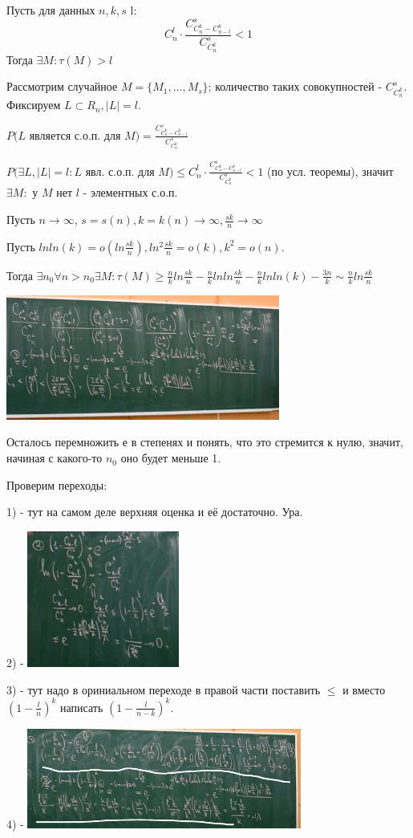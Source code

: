 \Th Пусть для данных $n, k, s$ l: 
\[ C_n^l \cdot \frac{C_{C_n^k - C_{n-l}^k}^s}{C_{C_n^k}^{s}} < 1\]
Тогда $\exists M: \tau(M) > l$

\Proof
Рассмотрим случайное $M = \{M_1, \dots, M_s \}$; количество таких совокупностей - ${C_{C_n^k}^{s}}$. Фиксируем $L \subset R_n, |L| = l$. 

$P(L$ является с.о.п. для $M) = \frac{C_{C_n^k - C_{n-l}^k}^s}{C_{C_n^k}^{s}}$

$P(\exists L, |L| = l: L $ явл. с.о.п. для $M) \leqslant C_n^l \cdot \frac{C_{C_n^k - C_{n-l}^k}^s}{C_{C_n^k}^{s}} < 1$ (по усл. теоремы), значит $\exists M:$ у $M$ нет $l$ - элементных с.о.п.
\EndProof

\Cor \Th Пусть $n \to \infty$, $s=s(n), k=k(n) \to \infty, \frac{sk}{n} \to \infty$

Пусть $ln ln (k) = o(ln \frac{sk}{n}), ln^2 \frac{sk}{n} = o(k), k^2 = o(n)$. 

Тогда $\exists n_0 \forall n > n_0 \exists M: \tau(M) \geqslant \frac{n}{k} ln \frac{sk}{n} - \frac{n}{k} ln ln \frac{sk}{n} - \frac{n}{k} ln ln (k) - \frac{3n}{k} \sim \frac{n}{k} ln \frac{sk}{n}$

\includegraphics[width=9cm]{images/est4.JPG}

Осталось перемножить е в степенях и понять, что это стремится к нулю, значит, начиная с какого-то $n_0$ оно будет меньше 1.

Проверим переходы:

1) - тут на самом деле верхняя оценка и её достаточно. Ура.

2) - \includegraphics[width=5cm]{images/est6.JPG}

3) - тут надо в ориниальном переходе в правой части поставить $\leqslant$ и вместо $(1 - \frac{l}{n})^k$ написать $(1 - \frac{l}{n-k})^k$.

4) - \includegraphics[width=9cm]{images/est7.JPG}